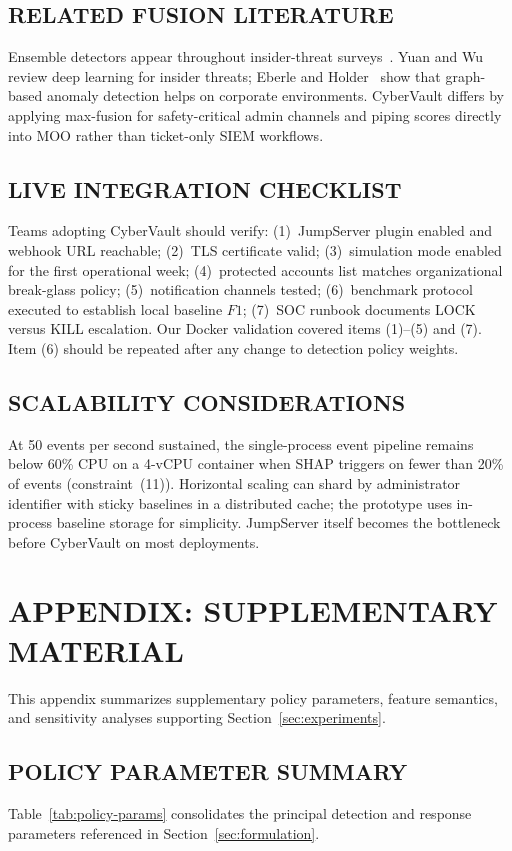 \documentclass{ieeeaccess}
\begin{document}
\subsection{RELATED FUSION LITERATURE}
Ensemble detectors appear throughout insider-threat surveys~\cite{ref2,ref9,ref11,ref24,ref32,ref44,ref48}. Yuan and Wu~\cite{ref11} review deep learning for insider threats; Eberle and Holder~\cite{ref9} show that graph-based anomaly detection helps on corporate environments. CyberVault differs by applying max-fusion for safety-critical admin channels and piping scores directly into MOO rather than ticket-only SIEM workflows.

\subsection{LIVE INTEGRATION CHECKLIST}
Teams adopting CyberVault should verify: (1)~JumpServer plugin enabled and webhook URL reachable; (2)~TLS certificate valid; (3)~simulation mode enabled for the first operational week; (4)~protected accounts list matches organizational break-glass policy; (5)~notification channels tested; (6)~benchmark protocol executed to establish local baseline $F1$; (7)~SOC runbook documents LOCK versus KILL escalation. Our Docker validation covered items (1)--(5) and (7). Item (6) should be repeated after any change to detection policy weights.

\subsection{SCALABILITY CONSIDERATIONS}
At 50 events per second sustained, the single-process event pipeline remains below 60\% CPU on a 4-vCPU container when SHAP triggers on fewer than 20\% of events (constraint~(11)). Horizontal scaling can shard by administrator identifier with sticky baselines in a distributed cache; the prototype uses in-process baseline storage for simplicity. JumpServer itself becomes the bottleneck before CyberVault on most deployments.

\section{APPENDIX: SUPPLEMENTARY MATERIAL}
\label{sec:appendix}

This appendix summarizes supplementary policy parameters, feature semantics, and sensitivity analyses supporting Section~\ref{sec:experiments}.

\subsection{POLICY PARAMETER SUMMARY}
Table~\ref{tab:policy-params} consolidates the principal detection and response parameters referenced in Section~\ref{sec:formulation}.
\end{document}
